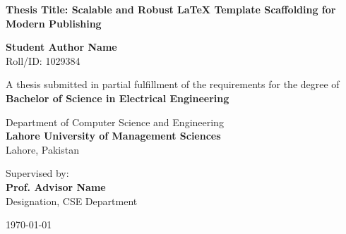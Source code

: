 \begin{titlepage}
\begin{center}
    \vspace*{1cm}
    
    
    \vspace{1.5cm}
    
    {\huge \bfseries \color{primary} Thesis Title: Scalable and Robust LaTeX Template Scaffolding for Modern Publishing}
    
    \vspace{1.5cm}
    
    {\Large \bfseries Student Author Name} \\
    \vspace{0.2cm}
    {Roll/ID: 1029384}
    
    \vspace{1.5cm}
    
    {A thesis submitted in partial fulfillment of the requirements for the degree of} \\
    \vspace{0.3cm}
    {\large \bfseries \color{secondary} Bachelor of Science in Electrical Engineering}
    
    \vspace{1.5cm}
    
    {\large Department of Computer Science and Engineering} \\
    \vspace{0.2cm}
    {\large \bfseries \color{primary} Lahore University of Management Sciences} \\
    \vspace{0.1cm}
    {Lahore, Pakistan}
    
    \vfill
    
    {Supervised by:} \\
    {\large \bfseries Prof. Advisor Name} \\
    {Designation, CSE Department}
    
    \vspace{1cm}
    
    {\large \today}
    
\end{center}
\end{titlepage}
